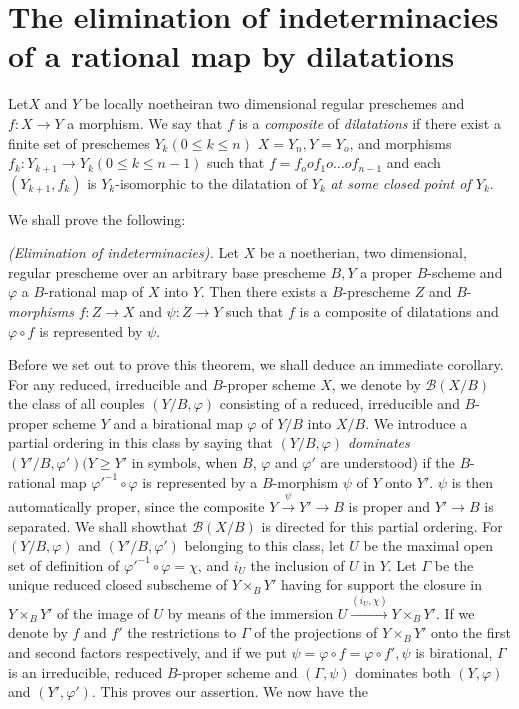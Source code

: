 \chapter[The elimination of indeterminacies of a rational...]{The elimination of indeterminacies of a rational map by
  dilatations}\label{chap4}%

 
Let\pageoriginale $X$ and $Y$ be locally noetheiran  two dimensional regular
preschemes and $f: X \to Y$ a morphism. We say that $f$ is a
\textit{composite} of \textit{dilatations} if there exist a finite set
of preschemes $Y_k(0 \le k \le n)$ $X=Y_n, Y=Y_o$, and morphisms
$f_k:Y_{k+1} \to Y_k(0 \le k \le n-1)$ such that $f=f_o o f_1 o \ldots
o f_{n-1}$ and each $(Y_{k+1},f_k)$ is $Y_k$-isomorphic to the
dilatation of $Y_k$ \textit{at some closed point of $Y_k$}. 
 
 We shall prove the following:

 \begin{theorem*}{\em (Elimination of indeterminacies).}
   Let $X$ be a noetherian, two dimensional, regular prescheme over an
   arbitrary base prescheme $B, Y$ a proper $B$-scheme and $\varphi$ a
   $B$-rational map of $X$ into $Y$. Then there exists a $B$-prescheme
   $Z$ and $B$-\textit{morphisms} $f:Z \to X$ and $\psi : Z \to Y$
   such that $f$ is a composite of dilatations and $\varphi \circ f$
   is represented by $\psi$. 
 \end{theorem*}

   Before we set out to prove this theorem, we shall deduce an
   immediate corollary. For any reduced, irreducible and $B$-proper
   scheme $X$, we denote by $\mathcal{B}(X/B)$ the class of all
   couples $(Y/B,\varphi)$ consisting of a reduced, irreducible and
   $B$-proper scheme $Y$ and a birational map $\varphi$ of $Y/B$ into
   $X/B$. We introduce a partial ordering in this class by saying that
   $(Y/B,\varphi)$ \textit{dominates} $(Y'/B, \varphi')(Y \ge Y'$ in
   symbols, when $B$, $\varphi$ and $\varphi'$ are understood) if the
   $B$-rational map $\varphi'^{-1}\circ \varphi$ is represented by a
   $B$-morphism $\psi$ of $Y$ onto $Y'$. $\psi$ is then automatically
   proper, since the composite $Y \overset{\psi} \to Y' \to B$ is
   proper and $Y' \to B$ is separated. We shall show\pageoriginale that
   $\mathcal{B}(X/B)$ is directed for this partial ordering. For
   $(Y/B,\varphi)$ and $(Y'/B,\varphi')$ belonging to this class, let
   $U$ be the maximal open set of definition of $\varphi'^{-1} \circ
   \varphi =\chi$, and $i_U$ the inclusion of $U$ in $Y$.  
   Let $\Gamma$ be the unique reduced closed subscheme of $Y
   \times_{B} Y'$ having for support the closure in $Y \times_B Y'$ of
   the image of $U$ by means of the immersion $U
   \xrightarrow{(i_U,\chi)} Y \times _B Y'$. If we denote by $f$
   and $f'$ the restrictions to $\Gamma$ of the projections of $Y \times_B
   Y'$ onto the first and second factors respectively, and if we put
   $\psi = \varphi \circ f = \varphi \circ f', \psi$ is birational,
   $\Gamma$ is an irreducible, reduced $B$-proper scheme and $(\Gamma,
   \psi)$ dominates both $(Y, \varphi)$ and $(Y', \varphi')$. This
   proves our assertion. We now have the  

